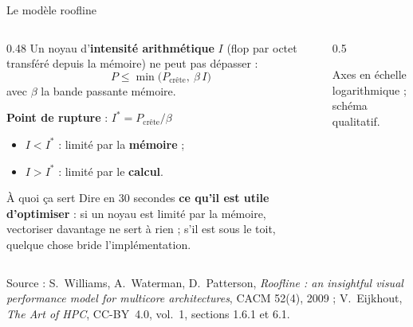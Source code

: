 \documentclass[8pt,aspectratio=169]{beamer}
\newcommand{\src}[1]{\vfill{\tiny\color{gray}Source : #1\par}}
\newcommand{\eij}{V.~Eijkhout, \emph{The Art of HPC}, CC-BY~4.0}
\begin{document}
\begin{frame}{Le modèle roofline}
\begin{columns}[T]
\begin{column}{0.48\textwidth}
Un noyau d'\textbf{intensité arithmétique} $I$ (flop par octet transféré depuis la mémoire) ne peut pas dépasser :
\[
P \le \min\bigl(P_{\text{crête}},\ \beta\, I\bigr)
\]
avec $\beta$ la bande passante mémoire.

\medskip
\textbf{Point de rupture} : $I^* = P_{\text{crête}} / \beta$
\begin{itemize}
\item $I < I^*$ : limité par la \textbf{mémoire} ;
\item $I > I^*$ : limité par le \textbf{calcul}.
\end{itemize}

\medskip
\begin{block}{À quoi ça sert}
Dire en 30 secondes \textbf{ce qu'il est utile d'optimiser} : si un noyau est limité par la mémoire, vectoriser davantage ne sert à rien ; s'il est sous le toit, quelque chose bride l'implémentation.
\end{block}
\end{column}
\begin{column}{0.5\textwidth}
\centering
{}

{\scriptsize Axes en échelle logarithmique ; schéma qualitatif.}
\end{column}
\end{columns}
\src{S.~Williams, A.~Waterman, D.~Patterson, \emph{Roofline : an insightful visual performance model for multicore architectures}, CACM 52(4), 2009 ; \eij{}, vol.~1, sections 1.6.1 et 6.1.}
\end{frame}
\end{document}
